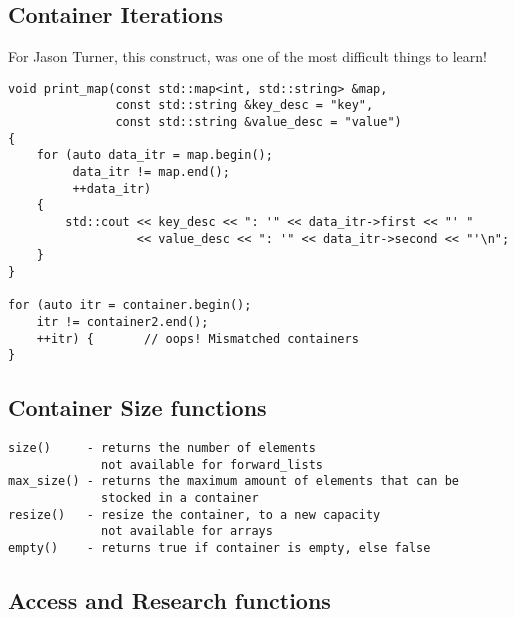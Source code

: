 \documentclass[openany]{report}
\begin{document}
\subsection{Container Iterations}

For Jason Turner, this construct, was one of the most difficult things to learn!

\begin{verbatim}
void print_map(const std::map<int, std::string> &map,
               const std::string &key_desc = "key",
               const std::string &value_desc = "value")
{
    for (auto data_itr = map.begin();
         data_itr != map.end();
         ++data_itr)
    {
        std::cout << key_desc << ": '" << data_itr->first << "' "
                  << value_desc << ": '" << data_itr->second << "'\n";
    }
}

for (auto itr = container.begin();
    itr != container2.end();
    ++itr) {       // oops! Mismatched containers
}
\end{verbatim}

\subsection{Container Size functions}

\begin{verbatim}
size()     - returns the number of elements
             not available for forward_lists
max_size() - returns the maximum amount of elements that can be
             stocked in a container
resize()   - resize the container, to a new capacity
             not available for arrays
empty()    - returns true if container is empty, else false
\end{verbatim}

\subsection{Access and Research functions}
\end{document}

